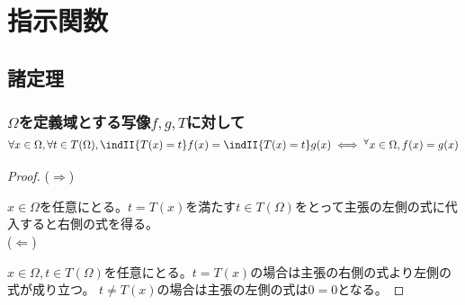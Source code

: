 \chapter{指示関数}
    \section{諸定理}
        \subsection{\texorpdfstring{$\Omega$}{Ω}を定義域とする写像\texorpdfstring{$f,g,T$}{f,g,T}に対して\texorpdfstring{$\forall x\in\Omega,\forall t\in T(\Omega), \indII{T(x)=t}f(x) = \indII{T(x)=t}g(x) \iff ^\forall x\in\Omega,f(x)=g(x)$}{∀x∈Ω, ∀t∈T(Ω), 1(T(x)=t)f(x) = 1(T(x)=t)g(x) ⇔ ∀x∈Ω, f(x)=g(x)}}
            \begin{proof}
                ($\Rightarrow$)
                \par
                $x\in\Omega$を任意にとる。$t=T(x)$を満たす$t\in T(\Omega)$をとって主張の左側の式に代入すると右側の式を得る。\\
                ($\Leftarrow$)
                \par
                $x\in\Omega,t\in T(\Omega)$を任意にとる。$t=T(x)$の場合は主張の右側の式より左側の式が成り立つ。
                $t\neq T(x)$の場合は主張の左側の式は$0=0$となる。
            \end{proof}